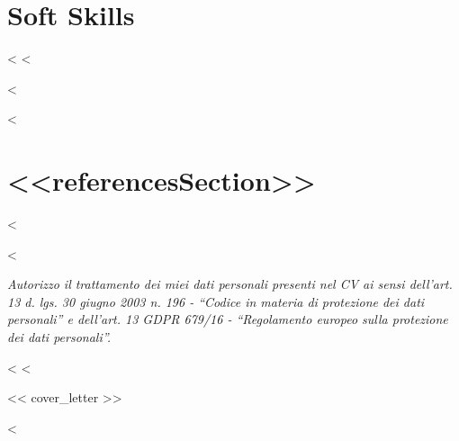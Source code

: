 \documentclass[10pt,a4paper,sans]{moderncv}
\begin{document}
\section{Soft Skills}
<%
<%
\renewcommand{\refname}{<<publicationSection>>}

\nocite{*}




<%

<%
\section{<<referencesSection>>}

<%

<%

\vfill
\begin{center}
\textit {\small Autorizzo il trattamento dei miei dati personali presenti nel CV ai sensi dell’art. 13 d. lgs. 30 giugno 2003 n. 196 - “Codice in materia di
protezione dei dati personali” e dell’art. 13 GDPR 679/16 - “Regolamento europeo sulla protezione dei dati personali”.}
\end{center}

<%
<%
\clearpage

<< cover_letter >>

<%
\end{document}
